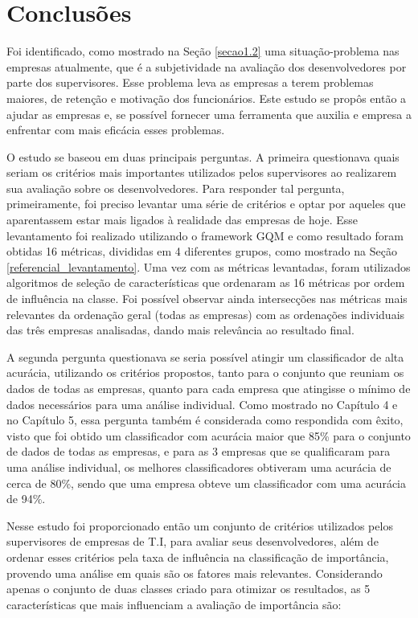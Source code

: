 \chapter[Conclusões]{Conclusões}

Foi identificado, como mostrado na Seção \ref{secao1.2} uma situação-problema nas empresas atualmente, que é a subjetividade na avaliação dos desenvolvedores por parte dos supervisores. Esse problema leva as empresas a terem problemas maiores, de retenção e motivação dos funcionários. Este estudo se propôs então a ajudar as empresas e, se possível fornecer uma ferramenta que auxilia e empresa a enfrentar com mais eficácia esses problemas.

O estudo se baseou em duas principais perguntas. A primeira questionava quais seriam os critérios mais importantes utilizados pelos supervisores ao realizarem sua avaliação sobre os desenvolvedores. Para responder tal pergunta, primeiramente, foi preciso levantar uma série de critérios e optar por aqueles que aparentassem estar mais ligados à realidade das empresas de hoje. Esse levantamento foi realizado utilizando o framework GQM e como resultado foram obtidas 16 métricas, divididas em 4 diferentes grupos, como mostrado na Seção \ref{referencial_levantamento}. Uma vez com as métricas levantadas, foram utilizados algoritmos de seleção de características que ordenaram as 16 métricas por ordem de influência na classe. Foi possível observar ainda intersecções nas métricas mais relevantes da ordenação geral (todas as empresas) com as ordenações individuais das três empresas analisadas, dando mais relevância ao resultado final.

A segunda pergunta questionava se seria possível atingir um classificador de alta acurácia, utilizando os critérios propostos, tanto para o conjunto que reuniam os dados de todas as empresas, quanto para cada empresa que atingisse o mínimo de dados necessários para uma análise individual. Como mostrado no Capítulo 4 e no Capítulo 5, essa pergunta também é considerada como respondida com êxito, visto que foi obtido um classificador com acurácia maior que 85\% para o conjunto de dados de todas as empresas, e para as 3 empresas que se qualificaram para uma análise individual, os melhores classificadores obtiveram uma acurácia de cerca de 80\%, sendo que uma empresa obteve um classificador com uma acurácia de 94\%.

Nesse estudo foi proporcionado então um conjunto de critérios utilizados pelos supervisores de empresas de T.I, para avaliar seus desenvolvedores, além de ordenar esses critérios pela taxa de influência na classificação de importância, provendo uma análise em quais são os fatores mais relevantes. Considerando apenas o conjunto de duas classes criado para otimizar os resultados, as 5 características que mais influenciam a avaliação de importância são:

